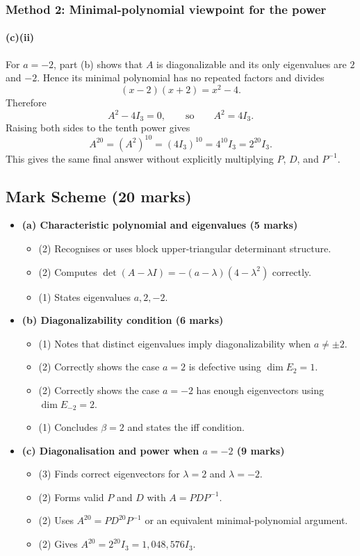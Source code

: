 \documentclass[12pt]{article}
\begin{document}
\subsubsection{Method 2: Minimal-polynomial viewpoint for the power}

\paragraph{(c)(ii)}
For $a=-2$, part (b) shows that $A$ is diagonalizable and its only eigenvalues are $2$ and $-2$. Hence its minimal polynomial has no repeated factors and divides
\[
(x-2)(x+2)=x^2-4.
\]
Therefore
\[
A^2-4I_3=0,
\qquad\text{so}\qquad
A^2=4I_3.
\]
Raising both sides to the tenth power gives
\[
A^{20}=(A^2)^{10}=(4I_3)^{10}=4^{10}I_3=2^{20}I_3.
\]
This gives the same final answer without explicitly multiplying $P$, $D$, and $P^{-1}$.

\subsection{Mark Scheme (20 marks)}
\begin{itemize}[leftmargin=1.6em]
  \item \textbf{(a) Characteristic polynomial and eigenvalues (5 marks)}
  \begin{itemize}[leftmargin=1.6em]
    \item (2) Recognises or uses block upper-triangular determinant structure.
    \item (2) Computes $\det(A-\lambda I)=-(a-\lambda)(4-\lambda^2)$ correctly.
    \item (1) States eigenvalues $a,2,-2$.
  \end{itemize}
  \item \textbf{(b) Diagonalizability condition (6 marks)}
  \begin{itemize}[leftmargin=1.6em]
    \item (1) Notes that distinct eigenvalues imply diagonalizability when $a\neq\pm2$.
    \item (2) Correctly shows the case $a=2$ is defective using $\dim E_2=1$.
    \item (2) Correctly shows the case $a=-2$ has enough eigenvectors using $\dim E_{-2}=2$.
    \item (1) Concludes $\beta=2$ and states the iff condition.
  \end{itemize}
  \item \textbf{(c) Diagonalisation and power when $a=-2$ (9 marks)}
  \begin{itemize}[leftmargin=1.6em]
    \item (3) Finds correct eigenvectors for $\lambda=2$ and $\lambda=-2$.
    \item (2) Forms valid $P$ and $D$ with $A=PDP^{-1}$.
    \item (2) Uses $A^{20}=PD^{20}P^{-1}$ or an equivalent minimal-polynomial argument.
    \item (2) Gives $A^{20}=2^{20}I_3=1{,}048{,}576I_3$.
  \end{itemize}
\end{itemize}
\end{document}
